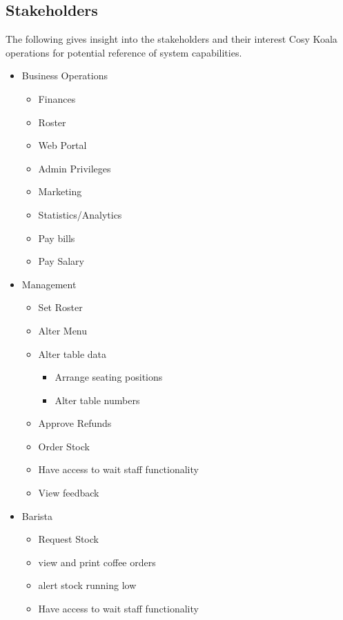 \documentclass{article}
\begin{document}
\subsection{Stakeholders} 
The following gives insight into the stakeholders and their interest Cosy Koala operations for potential reference of system capabilities.
\begin{itemize}
    \item {Business Operations}
    \begin{itemize}
        \item {Finances}
        \item {Roster}
        \item {Web Portal}
        \item {Admin Privileges}
        \item {Marketing}
        \item {Statistics/Analytics}
        \item Pay bills
        \item Pay Salary
    \end{itemize}
    \item {Management}
    \begin{itemize}
        \item {Set Roster}
        \item {Alter Menu}
        \item {Alter table data}
        \begin{itemize}
            \item {Arrange seating positions}
            \item {Alter table numbers}
        \end{itemize}
        \item {Approve Refunds}
        \item {Order Stock}
        \item {Have access to wait staff functionality}
        \item View feedback
    \end{itemize}
    \item {Barista}
    \begin{itemize}
        \item {Request Stock}
        \item view and print coffee orders
        \item alert stock running low
        \item {Have access to wait staff functionality}
    \end{itemize}

\end{itemize}
\end{document}

